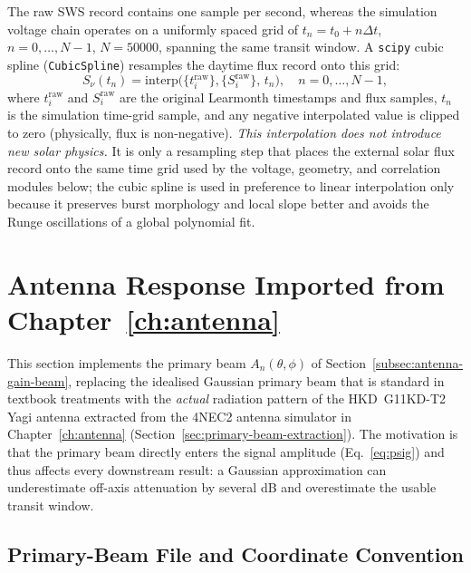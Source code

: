 The raw SWS record contains one sample per second, whereas the simulation
voltage chain operates on a uniformly spaced grid of $t_n=t_0+n\Delta t$,
$n=0,\ldots,N-1$, $N=\num{50000}$, spanning the same transit window. A
\texttt{scipy} cubic spline (\texttt{CubicSpline}) resamples the daytime flux
record onto this grid:
\begin{equation}
  S_\nu(t_n) = \mathrm{interp}\bigl(\{t_i^\mathrm{raw}\},
               \{S_i^\mathrm{raw}\},\,t_n\bigr), \quad n = 0,\ldots,N-1,
  \label{eq:spline}
\end{equation}
where $t_i^\mathrm{raw}$ and $S_i^\mathrm{raw}$ are the original Learmonth
timestamps and flux samples, $t_n$ is the simulation time-grid sample, and
any negative interpolated value is clipped to zero (physically, flux is
non-negative). \emph{This interpolation does not introduce new solar
physics.} It is only a resampling step that places the external solar flux
record onto the same time grid used by the voltage, geometry, and
correlation modules below; the cubic spline is used in preference to linear
interpolation only because it preserves burst morphology and local slope
better and avoids the Runge oscillations of a global polynomial fit.

\section{Antenna Response Imported from Chapter~\ref{ch:antenna}}
\label{sec:beam-integration}

This section implements the primary beam $A_n(\theta,\phi)$ of
Section~\ref{subsec:antenna-gain-beam}, replacing the idealised Gaussian
primary beam that is standard in textbook treatments with the \emph{actual}
radiation pattern of the HKD~G11KD-T2 Yagi antenna extracted from the 4NEC2
antenna simulator in Chapter~\ref{ch:antenna}
(Section~\ref{sec:primary-beam-extraction}). The motivation is that the
primary beam directly enters the signal amplitude (Eq.~\eqref{eq:psig}) and
thus affects every downstream result: a Gaussian approximation can
underestimate off-axis attenuation by several dB and overestimate the usable
transit window.

\subsection{Primary-Beam File and Coordinate Convention}
\label{subsec:beam-class}

